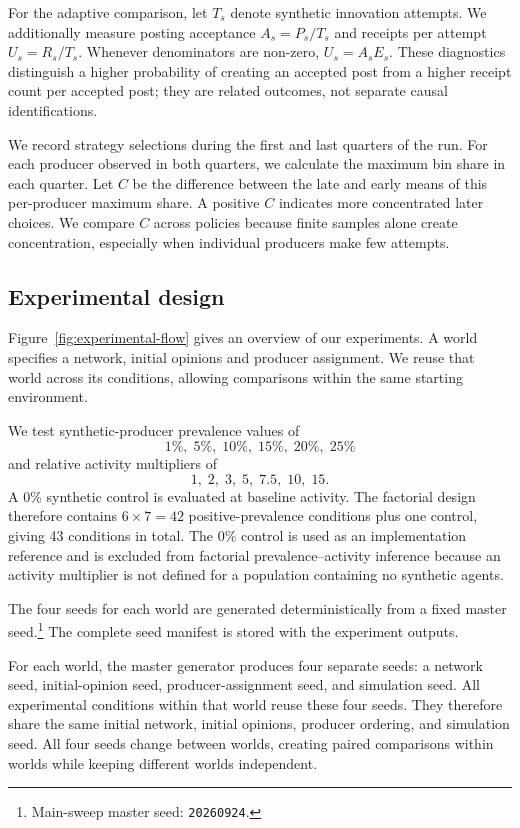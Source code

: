 \documentclass[runningheads]{llncs}
\begin{document}
For the adaptive comparison, let \(T_s\) denote synthetic innovation attempts. We additionally measure posting acceptance \(A_s=P_s/T_s\) and receipts per attempt \(U_s=R_s/T_s\). Whenever denominators are non-zero, \(U_s=A_sE_s\). These diagnostics distinguish a higher probability of creating an accepted post from a higher receipt count per accepted post; they are related outcomes, not separate causal identifications.

We record strategy selections during the first and last quarters of the run. For each producer observed in both quarters, we calculate the maximum bin share in each quarter. Let \(C\) be the difference between the late and early means of this per-producer maximum share. A positive \(C\) indicates more concentrated later choices. We compare \(C\) across policies because finite samples alone create concentration, especially when individual producers make few attempts.

\subsection{Experimental design}

Figure~\ref{fig:experimental-flow} gives an overview of our experiments. A world specifies a network, initial opinions and producer assignment. We reuse that world across its conditions, allowing comparisons within the same starting environment.



We test synthetic-producer prevalence values of
\[
1\%,\;5\%,\;10\%,\;15\%,\;20\%,\;25\%
\]
and relative activity multipliers of
\[
1,\;2,\;3,\;5,\;7.5,\;10,\;15.
\]
A 0\% synthetic control is evaluated at baseline activity. The factorial design therefore contains \(6\times7=42\) positive-prevalence conditions plus one control, giving 43 conditions in total. The 0\% control is used as an implementation reference and is excluded from factorial prevalence--activity inference because an activity multiplier is not defined for a population containing no synthetic agents.

The four seeds for each world are generated deterministically from a fixed master seed.\footnote{Main-sweep master seed: \texttt{20260924}.} The complete seed manifest is stored with the experiment outputs.

For each world, the master generator produces four separate seeds: a network seed, initial-opinion seed, producer-assignment seed, and simulation seed. All experimental conditions within that world reuse these four seeds. They therefore share the same initial network, initial opinions, producer ordering, and simulation seed. All four seeds change between worlds, creating paired comparisons within worlds while keeping different worlds independent.
\end{document}

